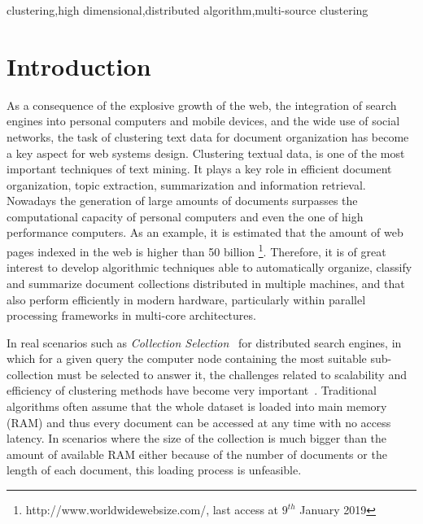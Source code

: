 \documentclass[preprint,12pt,authoryear,review]{elsarticle}
\begin{document}
\begin{frontmatter}
\begin{keyword}
clustering\sep high dimensional\sep distributed algorithm\sep multi-source clustering


\end{keyword}

\end{frontmatter}


\section{Introduction}
As a consequence of the explosive growth of the web, the integration of search engines into personal computers and mobile devices, and the wide use of social networks, the task of clustering text data for document organization has become a key aspect for web systems design. Clustering textual data, is one of the most important techniques of text mining. It plays a key role in efficient document organization, topic extraction, summarization and information retrieval. Nowadays the generation of large amounts of documents surpasses the computational capacity of personal computers and even the one of high performance computers. 
As an example, it is estimated that the amount of web pages indexed in the web is higher than 50 billion \footnote{http://www.worldwidewebsize.com/, last access at $9^{th}$ January 2019}.
Therefore, it is of great interest to develop algorithmic techniques able to automatically organize, classify and summarize document collections distributed in multiple machines, and that also perform efficiently in modern hardware, particularly within parallel processing frameworks in multi-core architectures. 

In real scenarios such as \textit{Collection Selection}~\cite{CM13} for distributed search engines, in which for a given query the computer node containing the most suitable sub-collection must be selected to answer it, 
the challenges related to scalability and efficiency of clustering methods have become very important~\cite{Mendoza16}. Traditional algorithms often assume that the whole dataset is loaded into main memory (RAM) and thus every document can be accessed at any time with no access latency. In scenarios where the size of the collection is much bigger than the amount of available RAM either because of the number of documents or the length of each document, this loading process is unfeasible.
\end{document}
